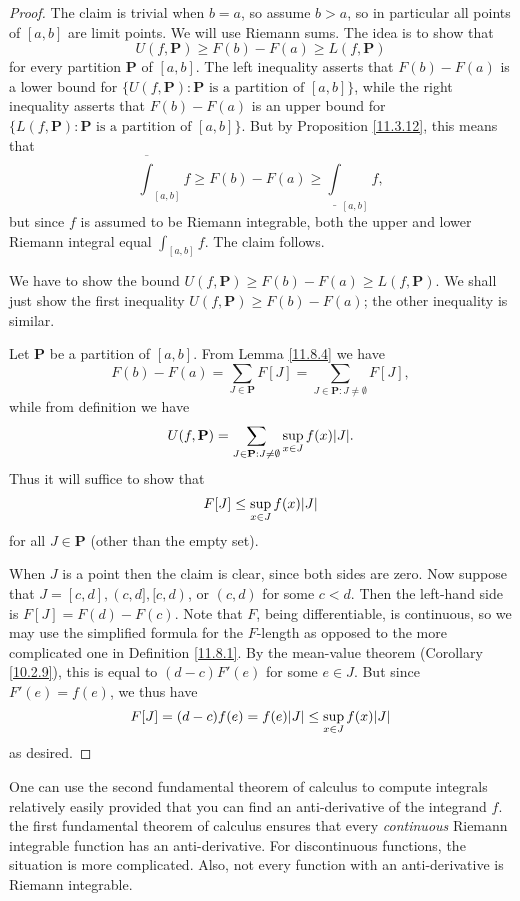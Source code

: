 \begin{proof}
    The claim is trivial when \(b = a\), so assume \(b > a\), so in particular all points of \([a, b]\) are limit points.
    We will use Riemann sums.
    The idea is to show that
    \[
        U(f, \mathbf{P}) \geq F(b) - F(a) \geq L(f, \mathbf{P})
    \]
    for every partition \(\mathbf{P}\) of \([a, b]\).
    The left inequality asserts that \(F(b) - F(a)\) is a lower bound for \(\{U(f, \mathbf{P}) : \mathbf{P} \text{ is a partition of } [a, b]\}\), while the right inequality asserts that \(F(b) - F(a)\) is an upper bound for \(\{L(f, \mathbf{P}) : \mathbf{P} \text{ is a partition of } [a, b]\}\).
    But by Proposition \ref{11.3.12}, this means that
    \[
        \overline{\int}_{[a, b]} f \geq F(b) - F(a) \geq \underline{\int}_{[a, b]} f,
    \]
    but since \(f\) is assumed to be Riemann integrable, both the upper and lower Riemann integral equal \(\int_{[a, b]} f\).
    The claim follows.

    We have to show the bound \(U(f, \mathbf{P}) \geq F(b) - F(a) \geq L(f, \mathbf{P})\).
    We shall just show the first inequality \(U(f, \mathbf{P}) \geq F(b) - F(a)\);
    the other inequality is similar.

    Let \(\mathbf{P}\) be a partition of \([a, b]\).
    From Lemma \ref{11.8.4} we have
    \[
        F(b) - F(a) = \sum_{J \in \mathbf{P}} F[J] = \sum_{J \in \mathbf{P} : J \neq \emptyset} F[J],
    \]
    while from definition we have
    \[
        U(f, \mathbf{P}) = \sum_{J \in \mathbf{P} : J \neq \emptyset} \sup_{x \in J} f(x) \abs*{J}.
    \]
    Thus it will suffice to show that
    \[
        F[J] \leq \sup_{x \in J} f(x) \abs*{J}
    \]
    for all \(J \in \mathbf{P}\)
    (other than the empty set).

    When \(J\) is a point then the claim is clear, since both sides are zero.
    Now suppose that \(J = [c, d], (c, d], [c, d)\), or \((c, d)\) for some \(c < d\).
    Then the left-hand side is \(F[J] = F(d) - F(c)\).
    Note that \(F\), being differentiable, is continuous, so we may use the simplified formula for the \(F\)-length as opposed to the more complicated one in Definition \ref{11.8.1}.
    By the mean-value theorem (Corollary \ref{10.2.9}), this is equal to \((d - c) F'(e)\) for some \(e \in J\).
    But since \(F'(e) = f(e)\), we thus have
    \[
        F[J] = (d - c) f(e) = f(e) \abs*{J} \leq \sup_{x \in J} f(x) \abs*{J}
    \]
    as desired.
\end{proof}

\begin{note}
    One can use the second fundamental theorem of calculus to compute integrals relatively easily provided that you can find an anti-derivative of the integrand \(f\).
    the first fundamental theorem of calculus ensures that every \emph{continuous} Riemann integrable function has an anti-derivative.
    For discontinuous functions, the situation is more complicated.
    Also, not every function with an anti-derivative is Riemann integrable.
\end{note}

